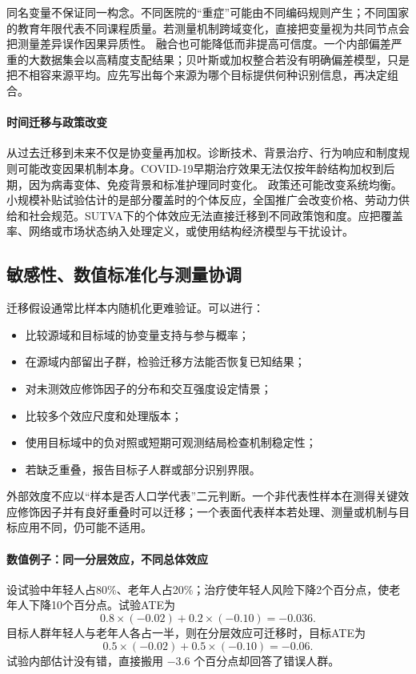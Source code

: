 同名变量不保证同一构念。不同医院的“重症”可能由不同编码规则产生；不同国家的教育年限代表不同课程质量。若测量机制跨域变化，直接把变量视为共同节点会把测量差异误作因果异质性。
融合也可能降低而非提高可信度。一个内部偏差严重的大数据集会以高精度支配结果；贝叶斯或加权整合若没有明确偏差模型，只是把不相容来源平均。应先写出每个来源为哪个目标提供何种识别信息，再决定组合。

\paragraph{时间迁移与政策改变}

从过去迁移到未来不仅是协变量再加权。诊断技术、背景治疗、行为响应和制度规则可能改变因果机制本身。COVID-19早期治疗效果无法仅按年龄结构加权到后期，因为病毒变体、免疫背景和标准护理同时变化。
政策还可能改变系统均衡。小规模补贴试验估计的是部分覆盖时的个体反应，全国推广会改变价格、劳动力供给和社会规范。SUTVA下的个体效应无法直接迁移到不同政策饱和度。应把覆盖率、网络或市场状态纳入处理定义，或使用结构经济模型与干扰设计。

\subsection{敏感性、数值标准化与测量协调}

迁移假设通常比样本内随机化更难验证。可以进行：

\begin{itemize}
  \item 比较源域和目标域的协变量支持与参与概率；
  \item 在源域内部留出子群，检验迁移方法能否恢复已知结果；
  \item 对未测效应修饰因子的分布和交互强度设定情景；
  \item 比较多个效应尺度和处理版本；
  \item 使用目标域中的负对照或短期可观测结局检查机制稳定性；
  \item 若缺乏重叠，报告目标子人群或部分识别界限。
\end{itemize}

外部效度不应以“样本是否人口学代表”二元判断。一个非代表性样本在测得关键效应修饰因子并有良好重叠时可以迁移；一个表面代表样本若处理、测量或机制与目标应用不同，仍可能不适用。

\paragraph{数值例子：同一分层效应，不同总体效应}

设试验中年轻人占80\%、老年人占20\%；治疗使年轻人风险下降2个百分点，使老年人下降10个百分点。试验ATE为
\[
0.8\times(-0.02)+0.2\times(-0.10)=-0.036.
\]
目标人群年轻人与老年人各占一半，则在分层效应可迁移时，目标ATE为
\[
0.5\times(-0.02)+0.5\times(-0.10)=-0.06.
\]
试验内部估计没有错，直接搬用 $-3.6$ 个百分点却回答了错误人群。

